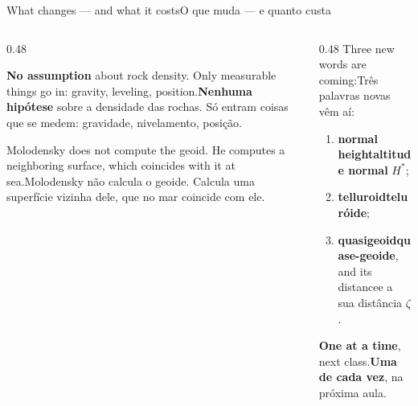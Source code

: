 \documentclass[aspectratio=169,11pt]{beamer}
\newcommand{\tr}[2]{\ifEN#2\else#1\fi}
\newcommand{\bnum}[1]{\textbf{\textcolor{mTeal}{#1}}}
\begin{document}
\begin{frame}{\tr{O que muda --- e quanto custa}{What changes --- and what it costs}}
  \begin{columns}[T]
    \begin{column}{0.48\textwidth}
      \begin{ideia}[title={\tr{O ganho}{The gain}}]
        \tr{\bnum{Nenhuma hipótese} sobre a densidade das rochas. Só entram coisas que se
        medem: gravidade, nivelamento, posição.}{\bnum{No assumption} about rock density.
        Only measurable things go in: gravity, leveling, position.}
      \end{ideia}
      \smallskip
      \begin{cuidado}[title={\tr{O preço}{The price}}]
        \tr{Molodensky \alert{não calcula o geoide}. Calcula uma superfície vizinha dele, que
        no mar coincide com ele.}{Molodensky \alert{does not compute the geoid}. He computes a
        neighboring surface, which coincides with it at sea.}
      \end{cuidado}
    \end{column}
    \begin{column}{0.48\textwidth}
      \tr{Três palavras novas vêm aí:}{Three new words are coming:}
      \medskip
      \begin{enumerate}
        \setlength{\itemsep}{6pt}
        \item \textcolor{corIdeal}{\textbf{\tr{altitude normal}{normal height}}} $H^{*}$;
        \item \textcolor{corIdeal}{\textbf{\tr{teluróide}{telluroid}}};
        \item \textcolor{corQuase}{\textbf{\tr{quase-geoide}{quasigeoid}}}, \tr{e a sua
              distância}{and its distance} $\zeta$.
      \end{enumerate}
      \medskip
      \tr{\bnum{Uma de cada vez}, na próxima aula.}{\bnum{One at a time}, next class.}
    \end{column}
  \end{columns}
\end{frame}
\end{document}
